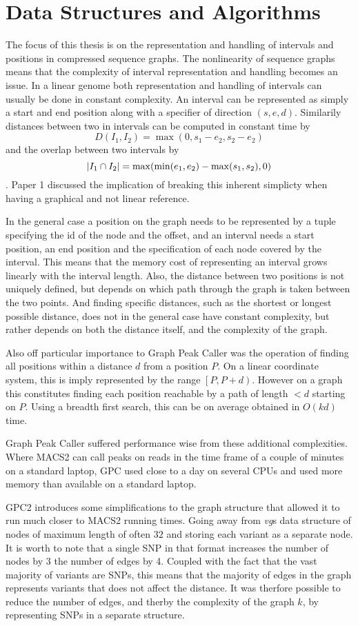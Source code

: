 \section{Data Structures and Algorithms}
The focus of this thesis is on the representation and handling of intervals and positions in compressed sequence graphs.
The nonlinearity of sequence graphs means that the complexity of interval representation and handling becomes an issue.
In a linear genome both representation and handling of intervals can usually be done in constant complexity.
An interval can be represented as simply a start and end position along with a specifier of direction $(s, e, d)$.
Similarily distances between two in intervals can be computed in constant time by
$$D(I_1, I_2) = \max(0, s_1-e_2, s_2-e_2)$$
and the overlap between two intervals by
$$\left|I_1 \cap I_2\right| = \max(\min(e_1, e_2) - \max(s_1, s_2), 0)$$.
Paper 1 discussed the implication of breaking this inherent simplicty when having a graphical and not linear reference.

In the general case a position on the graph needs to be represented by a tuple specifying the id of the node and the offset, and an interval needs a start position, 
an end position and the specification of each node covered by the interval.
This means that the memory cost of representing an interval grows linearly with the interval length.
Also, the distance between two positions is not uniquely defined, but depends on which path through the graph is taken between the two points.
And finding specific distances, such as the shortest or longest possible distance, does not in the general case have constant complexity, but rather depends on both the distance itself, and the complexity of the graph.

Also off particular importance to Graph Peak Caller was the operation of finding all positions within a distance $d$ from a position $P$. On a linear coordinate system, this is imply represented by the range $\left[P, P+d\right)$. However on a graph this constitutes finding each position reachable by a path of length $<d$ starting on $P$. Using a breadth first search, this can be on average obtained in $O(kd)$ time.

Graph Peak Caller suffered performance wise from these additional complexities. Where MACS2 can call peaks on  reads in the time frame of a couple of minutes on a standard laptop, GPC used close to a day on several CPUs and used more memory than available on a standard laptop. 

GPC2 introduces some simplifications to the graph structure that allowed it to run much closer to MACS2 running times.
Going away from \emph{vg}s data structure of nodes of maximum length of often $32$ and storing each variant as a separate node. 
It is worth to note that a single SNP in that format increases the number of nodes by 3 the number of edges by 4. Coupled with the fact that the vast majority of variants are SNPs, this means that the majority of edges in the graph represents variants that does not affect the distance. It was therfore possible to reduce the number of edges, and therby the complexity of the graph $k$, by representing SNPs in a separate structure.



